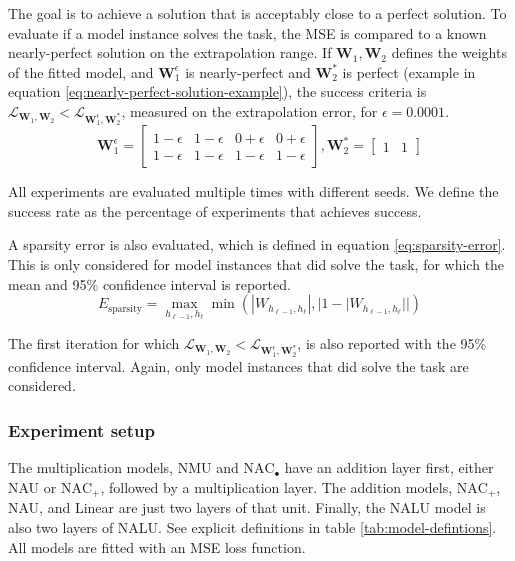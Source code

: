 The goal is to achieve a solution that is acceptably close to a perfect solution. To evaluate if a model instance solves the task, the MSE is compared to a known nearly-perfect solution on the extrapolation range. If $\mathbf{W}_1, \mathbf{W}_2$ defines the weights of the fitted model, and $\mathbf{W}_1^\epsilon$ is nearly-perfect and $\mathbf{W}_2^*$ is perfect (example in equation \ref{eq:nearly-perfect-solution-example}), the success criteria is $\mathcal{L}_{\mathbf{W}_1, \mathbf{W}_2} < \mathcal{L}_{\mathbf{W}_1^\epsilon, \mathbf{W}_2^*}$, measured on the extrapolation error, for $\epsilon = 0.0001$.
\begin{equation}
    \mathbf{W}_1^\epsilon = \begin{bmatrix}
    1 - \epsilon & 1 - \epsilon & 0 + \epsilon & 0 + \epsilon \\
    1 - \epsilon & 1 - \epsilon & 1 - \epsilon & 1 - \epsilon
    \end{bmatrix}, \mathbf{W}_2^* = \begin{bmatrix}
    1 & 1
    \end{bmatrix}
    \label{eq:nearly-perfect-solution-example}
\end{equation}

All experiments are evaluated multiple times with different seeds. We define the success rate as the percentage of experiments that achieves success.

A sparsity error is also evaluated, which is defined in equation \ref{eq:sparsity-error}. This is only considered for model instances that did solve the task, for which the mean and 95\% confidence interval is reported.
\begin{equation}
E_\mathrm{sparsity} = \max_{h_{\ell-1}, h_{\ell}} \min(|W_{h_{\ell-1},h_\ell}|, |1 - |W_{h_{\ell-1},h_\ell}||)
\label{eq:sparsity-error}
\end{equation}

The first iteration for which $\mathcal{L}_{\mathbf{W}_1, \mathbf{W}_2} < \mathcal{L}_{\mathbf{W}_1^\epsilon, \mathbf{W}_2^*}$, is also reported with the 95\% confidence interval. Again, only model instances that did solve the task are considered. 

\subsubsection{Experiment setup}

The multiplication models, NMU and $\mathrm{NAC}_{\bullet}$ have an addition layer first, either NAU or $\mathrm{NAC}_{+}$, followed by a multiplication layer. The addition models, $\mathrm{NAC}_{+}$, NAU, and Linear are just two layers of that unit. Finally, the NALU model is also two layers of NALU. See explicit definitions in table \ref{tab:model-defintions}. All models are fitted with an MSE loss function.


